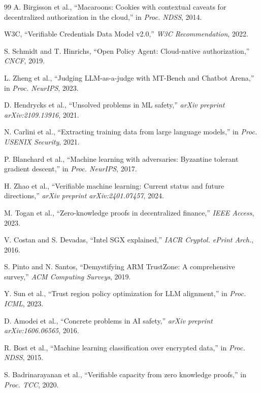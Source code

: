 \documentclass[10pt,conference]{IEEEtran}
\begin{document}
\begin{thebibliography}{99}
A. Birgisson et al., ``Macaroons: Cookies with contextual caveats for decentralized authorization in the cloud,'' in \textit{Proc. NDSS}, 2014.

W3C, ``Verifiable Credentials Data Model v2.0,'' \textit{W3C Recommendation}, 2022.

S. Schmidt and T. Hinrichs, ``Open Policy Agent: Cloud-native authorization,'' \textit{CNCF}, 2019.

L. Zheng et al., ``Judging LLM-as-a-judge with MT-Bench and Chatbot Arena,'' in \textit{Proc. NeurIPS}, 2023.

D. Hendrycks et al., ``Unsolved problems in ML safety,'' \textit{arXiv preprint arXiv:2109.13916}, 2021.

N. Carlini et al., ``Extracting training data from large language models,'' in \textit{Proc. USENIX Security}, 2021.

P. Blanchard et al., ``Machine learning with adversaries: Byzantine tolerant gradient descent,'' in \textit{Proc. NeurIPS}, 2017.

H. Zhao et al., ``Verifiable machine learning: Current status and future directions,'' \textit{arXiv preprint arXiv:2401.07457}, 2024.

M. Togan et al., ``Zero-knowledge proofs in decentralized finance,'' \textit{IEEE Access}, 2023.

V. Costan and S. Devadas, ``Intel SGX explained,'' \textit{IACR Cryptol. ePrint Arch.}, 2016.

S. Pinto and N. Santos, ``Demystifying ARM TrustZone: A comprehensive survey,'' \textit{ACM Computing Surveys}, 2019.

Y. Sun et al., ``Trust region policy optimization for LLM alignment,'' in \textit{Proc. ICML}, 2023.

D. Amodei et al., ``Concrete problems in AI safety,'' \textit{arXiv preprint arXiv:1606.06565}, 2016.

R. Bost et al., ``Machine learning classification over encrypted data,'' in \textit{Proc. NDSS}, 2015.

S. Badrinarayanan et al., ``Verifiable capacity from zero knowledge proofs,'' in \textit{Proc. TCC}, 2020.


\end{thebibliography}
\end{document}

